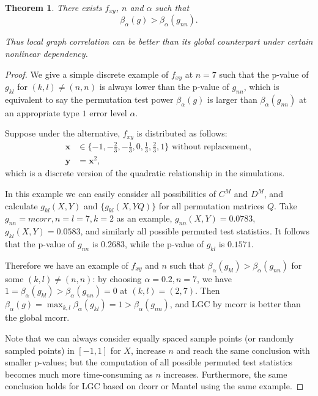 \documentclass[11pt]{article}
\providecommand{\mb}[1]{\boldsymbol{#1}}
\newtheorem{thm}{Theorem}
\begin{document}
\begin{thm}
There exists $f_{xy}$, $n$ and $\alpha$ such that 
\begin{equation}
\beta_{\alpha}(g) > \beta_{\alpha}(g_{nn}).
\end{equation}

Thus local graph correlation can be better than its global counterpart under certain nonlinear dependency.
\end{thm}
\begin{proof}
We give a simple discrete example of $f_{xy}$ at $n=7$ such that the p-value of $g_{kl}$ for $(k,l) \neq (n,n)$ is always lower than the p-value of $g_{nn}$, which is equivalent to say the permutation test power $\beta_{\alpha}(g)$ is larger than $\beta_{\alpha}(g_{nn})$ at an appropriate type $1$ error level $\alpha$.

Suppose under the alternative, $f_{xy}$ is distributed as follows:
\begin{align*} 
\mb{x} &\in \{-1,-\frac{2}{3},-\frac{1}{3},0,\frac{1}{3},\frac{2}{3},1\} \mbox{ without replacement}, \\
\mb{y} &= \mb{x}^2,
\end{align*}
which is a discrete version of the quadratic relationship in the simulations.

In this example we can easily consider all possibilities of $C^{M}$ and $D^{M}$, and calculate $g_{kl}(X, Y)$ and $\{g_{kl}(X, YQ)\}$ for all permutation matrices $Q$. Take $g_{nn}=mcorr, n=l=7, k=2$ as an example, $g_{nn}(X, Y)=0.0783$, $g_{kl}(X, Y)=0.0583$, and similarly all possible permuted test statistics. It follows that the p-value of $g_{nn}$ is $0.2683$, while the p-value of $g_{kl}$ is $0.1571$. 

Therefore we have an example of $f_{xy}$ and $n$ such that $\beta_{\alpha}(g_{kl}) > \beta_{\alpha}(g_{nn})$ for some $(k,l) \neq (n,n)$: by choosing $\alpha=0.2, n=7$, we have $1=\beta_{\alpha}(g_{kl}) > \beta_{\alpha}(g_{nn})=0$ at $(k,l)=(2,7)$. Then $\beta_{\alpha}(g)=\max_{k,l}{\beta_{\alpha}(g_{kl})}=1>\beta_{\alpha}(g_{nn})$, and LGC by mcorr is better than the global mcorr.

Note that we can always consider equally spaced sample points (or randomly sampled points) in $[-1,1]$ for $X$, increase $n$ and reach the same conclusion with smaller p-values; but the computation of all possible permuted test statistics becomes much more time-consuming as $n$ increases. Furthermore, the same conclusion holds for LGC based on dcorr or Mantel using the same example.
\end{proof}




\end{document}
